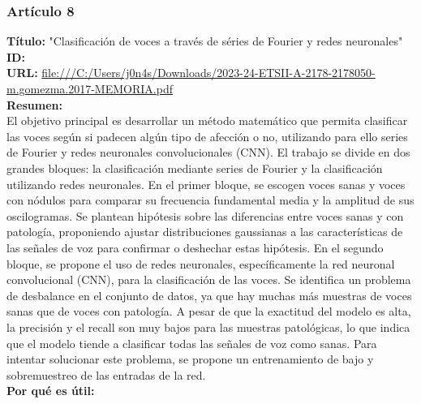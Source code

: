 \subsubsection*{Artículo 8}
    \textbf{Título:}
    "Clasificación de voces a través de séries de Fourier y redes neuronales"
    \\
    \textbf{ID: \cite{gomez2023clasificacion}}
    \\
    \textbf{URL:}
    \url{file:///C:/Users/j0n4s/Downloads/2023-24-ETSII-A-2178-2178050-m.gomezma.2017-MEMORIA.pdf}
    \\
    \textbf{Resumen:\\}
    El objetivo principal es desarrollar un método matemático que permita clasificar las voces según si padecen algún tipo de afección o no, utilizando para ello series de Fourier y redes neuronales convolucionales (CNN).
    El trabajo se divide en dos grandes bloques: la clasificación mediante series de Fourier y la clasificación utilizando redes neuronales. En el primer bloque, se escogen voces sanas y voces con nódulos para comparar su frecuencia fundamental media y la amplitud de sus oscilogramas. Se plantean hipótesis sobre las diferencias entre voces sanas y con patología, proponiendo ajustar distribuciones gaussianas a las características de las señales de voz para confirmar o deshechar estas hipótesis.
    En el segundo bloque, se propone el uso de redes neuronales, específicamente la red neuronal convolucional (CNN), para la clasificación de las voces. Se identifica un problema de desbalance en el conjunto de datos, ya que hay muchas más muestras de voces sanas que de voces con patología. A pesar de que la exactitud del modelo es alta, la precisión y el recall son muy bajos para las muestras patológicas, lo que indica que el modelo tiende a clasificar todas las señales de voz como sanas. Para intentar solucionar este problema, se propone un entrenamiento de bajo y sobremuestreo de las entradas de la red.
    \\
    \textbf{Por qué es útil:\\}

